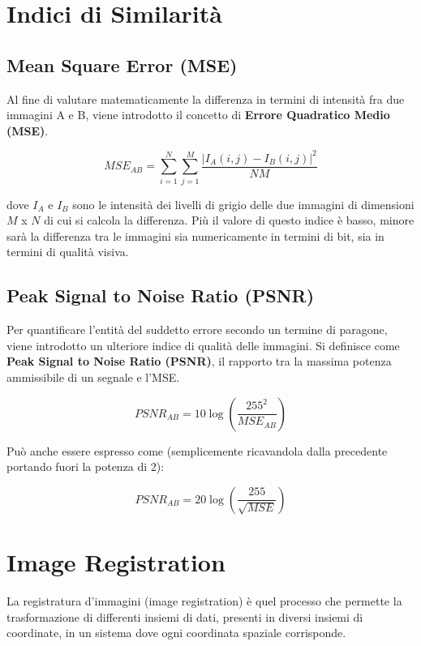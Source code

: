 \chapter{Indici di Similarità}

\section{Mean Square Error (MSE)}

Al fine di valutare matematicamente la differenza in termini di intensità fra due immagini A e B, viene introdotto il concetto di
\textbf{Errore Quadratico Medio (MSE)}.

$$
    MSE_{AB} = \sum_{i=1}^{N}\sum_{j=1}^{M}\frac{|I_A(i,j)-I_B(i,j)|^2}{NM}
$$

dove $I_A$ e $I_B$ sono le intensità dei livelli di grigio delle due immagini di dimensioni $M$ x $N$ di cui si calcola la differenza. Più il valore di questo indice è basso, minore sarà la differenza tra
le immagini sia numericamente in termini di bit, sia in termini di qualità visiva.

\section{Peak Signal to Noise Ratio (PSNR)}

Per quantificare l'entità del suddetto errore secondo un termine di paragone, viene introdotto un ulteriore indice di qualità delle
immagini. Si definisce come \textbf{Peak Signal to Noise Ratio (PSNR)}, il rapporto
tra la massima potenza ammissibile di un segnale e l'MSE.

$$
    PSNR_{AB} = 10 \log(\frac{255^2}{MSE_{AB}})
$$

Può anche essere espresso come (semplicemente ricavandola dalla precedente
portando fuori la potenza di 2):

$$
    PSNR_{AB} = 20 \log(\frac{255}{\sqrt{MSE}})
$$

\chapter{Image Registration}

\begin{definition}
    La registratura d'immagini (image registration) è quel processo che permette la trasformazione di differenti insiemi di dati, presenti in diversi insiemi di coordinate, in un sistema dove ogni coordinata
    spaziale corrisponde.
\end{definition}

